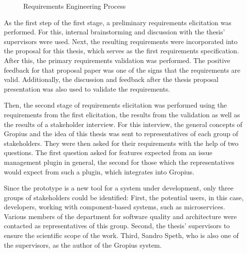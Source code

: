 \begin{figure}[!h]
	\caption{Requirements Engineering Process}
	\label{fig:requirmentsProcess}
\end{figure}

As the first step of the first stage, a preliminary requirements elicitation was performed. 
For this, internal brainstorming and discussion with the thesis' supervisors were used.
Next, the resulting requirements were incorporated into the proposal for this thesis, 
which serves as the first requirements specification.
After this, the primary requirements validation was performed. 
The positive feedback for that proposal paper was one of the signs that the requirements are valid.
Additionally, the discussion and feedback after the thesis proposal presentation was also used to validate the requirements.

Then, the second stage of requirements elicitation was performed using the requirements from the first elicitation, 
the results from the validation as well as the results of a stakeholder interview.
For this interview, the general concepts of Gropius and the idea of this thesis was sent to representatives of each group of stakeholders. 
They were then asked for their requirements with the help of two questions.
The first question asked for features expected from an issue management plugin in general,
the second for those which the representatives would expect from such a plugin, which integrates into \gls{Gropius}.

Since the prototype is a new tool for a system under development, only three groups of stakeholders could be identified:
First, the potential users, in this case, developers, working with component-based systems, such as microservices.
Various members of the department for software quality and architecture were contacted as representatives of this group.
Second, the thesis' supervisors to ensure the scientific scope of the work. 
Third, Sandro Speth, who is also one of the supervisors, as the author of the \gls{Gropius} system.

